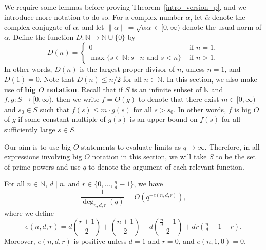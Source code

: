 \documentclass[Unicode,ALCO]{cedram}
\newcommand{\N}{\mathbb{N}}
\newcommand{\myemph}{\textbf}
\begin{document}
We require some lemmas before proving Theorem~\ref{intro_version_p}, and we introduce more notation to do so.
For a complex number \(\alpha\), let \(\bar{\alpha}\) denote the complex conjugate of \(\alpha\), and let \(\| \alpha \| = \sqrt{\alpha \bar{\alpha}} \in [0,\infty)\) denote the usual norm of \(\alpha\).
Define the function \(D : \N \to \N \cup \{0\}\) by
\begin{equation}
D(n) =
\begin{cases}
0 & \text{ if } n = 1, \\
\max \{ s \in \N : s \mid n \text{ and } s < n\} & \text{ if } n > 1.
\end{cases}
\end{equation}
In other words, \(D(n)\) is the largest proper divisor of \(n\), unless \(n = 1\), and \(D(1) = 0\).
Note that \(D(n) \leq n/2\) for all \(n \in \N\).
In this section, we also make use of \myemph{big \(O\) notation}.
Recall that if \(S\) is an infinite subset of \(\N\) and \(f,g : S \to [0,\infty)\), then we write \(f = O(g)\) to denote that there exist \(m \in [0,\infty)\) and \(s_0 \in S\) such that \(f(s) \leq m \cdot g(s)\) for all \(s > s_0\).
In other words, \(f\) is big \(O\) of \(g\) if some constant multiple of \(g(s)\) is an upper bound on \(f(s)\) for all sufficiently large \(s \in S\).

\begin{remark}
	Our aim is to use big \(O\) statements to evaluate limits as \(q \to \infty\).
	Therefore, in all expressions involving big \(O\) notation in this section, we will take \(S\) to be the set of prime powers and use \(q\) to denote the argument of each relevant function.
\end{remark}


\begin{lemma}
\label{degree_limit_lemma}
For all \(n \in \N, \, d \mid n\), and \(r \in \{0,\ldots,\tfrac{n}{d}-1\}\), we have
\begin{equation}
\frac{1}{\deg_{n,d,r} (q)}
=
O \left (
q^{-e(n,d,r)}
\right ),
\end{equation}
where we define
\begin{equation}
\label{definition_of_e}
e(n,d,r)
=
d\binom{r+1}{2} + \binom{n+1}{2} - d\binom{\tfrac{n}{d} + 1}{2} + dr\left ( \tfrac{n}{d}-1-r \right ).
\end{equation}
Moreover, \(e(n,d,r)\) is positive unless \(d = 1\) and \(r = 0\), and \(e(n,1,0) = 0\).
\end{lemma}
\end{document}

